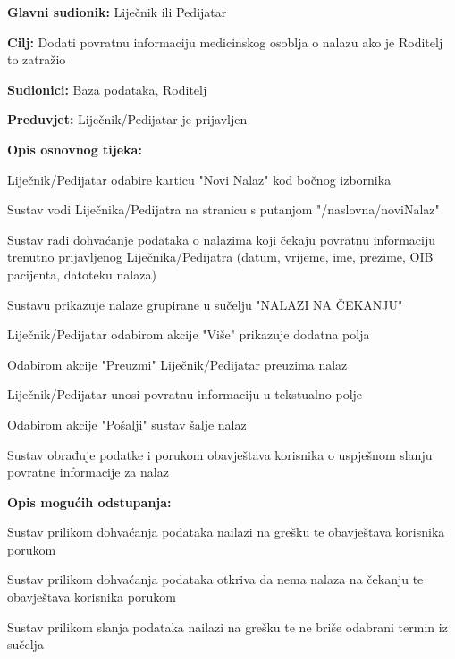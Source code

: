 					
					
					
				\noindent {}
					\begin{packed_item}
						
						\item \textbf{Glavni sudionik: }Liječnik ili Pedijatar
						\item  \textbf{Cilj:} Dodati povratnu informaciju medicinskog osoblja o nalazu ako je Roditelj to zatražio
						\item  \textbf{Sudionici:} Baza podataka, Roditelj
						\item  \textbf{Preduvjet:} Liječnik/Pedijatar je prijavljen
						\item  \textbf{Opis osnovnog tijeka:}
						
						\item[] \begin{packed_enum}
							\item Liječnik/Pedijatar odabire karticu "Novi Nalaz" kod bočnog izbornika
							\item Sustav vodi Liječnika/Pedijatra na stranicu s putanjom "/naslovna/noviNalaz"
							\item Sustav radi dohvaćanje podataka o nalazima koji čekaju povratnu informaciju trenutno prijavljenog Liječnika/Pedijatra (datum, vrijeme, ime, prezime, OIB pacijenta, datoteku nalaza)
							\item Sustavu prikazuje nalaze grupirane u sučelju "NALAZI NA ČEKANJU"
							\item Liječnik/Pedijatar odabirom akcije "Više" prikazuje dodatna polja
							\item Odabirom akcije "Preuzmi" Liječnik/Pedijatar preuzima nalaz
							\item Liječnik/Pedijatar unosi povratnu informaciju u tekstualno polje
							\item Odabirom akcije "Pošalji" sustav šalje nalaz
							\item Sustav obrađuje podatke i porukom obavještava korisnika o uspješnom slanju povratne informacije za nalaz
						\end{packed_enum}
						
						\item  \textbf{Opis mogućih odstupanja:}
						
						\item[] \begin{packed_item}
							\item[3.a] Sustav prilikom dohvaćanja podataka nailazi na grešku te obavještava korisnika porukom
							
							\item[3.b] Sustav prilikom dohvaćanja podataka otkriva da nema nalaza na čekanju te obavještava korisnika porukom
							
							\item[9.a] Sustav prilikom slanja podataka nailazi na grešku te ne briše odabrani termin iz sučelja
						\end{packed_item}
					\end{packed_item}		
					
